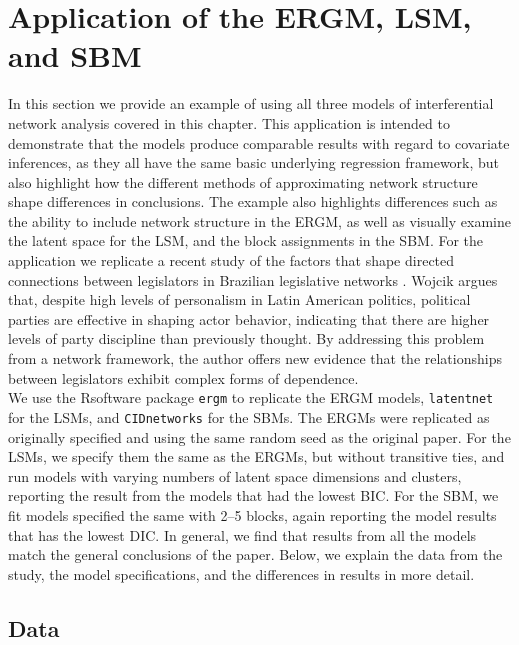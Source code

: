 \documentclass[fleqn,12pt]{wlscirep}
\newcommand{\R}{\textsf{R}\space} %
\begin{document}
\section{Application of the ERGM, LSM, and SBM}
In this section we provide an example of using all three models of interferential network analysis covered in this chapter. This application is intended to demonstrate that the models produce comparable results with regard to covariate inferences, as they all have the same basic underlying regression framework, but also highlight how the different methods of approximating network structure shape differences in conclusions. The example also highlights differences such as the ability to include network structure in the ERGM, as well as visually examine the latent space for the LSM, and the block assignments in the SBM. For the application we replicate a recent study of the factors that shape directed connections between legislators in Brazilian legislative networks \citep{wojcik2017legislative}. Wojcik argues that, despite high levels of personalism in Latin American politics, political parties are effective in shaping actor behavior, indicating that there are higher levels of party discipline than previously thought. By addressing this problem from a network framework, the author offers new evidence that the relationships between legislators exhibit complex forms of dependence.\\

We use the \R software package \texttt{ergm} \citep{ergm} to replicate the ERGM models, \texttt{latentnet} \citep{latentnet} for the LSMs, and \texttt{CIDnetworks} \citep{cidnetworks} for the SBMs. The ERGMs were replicated as originally specified and using the same random seed as the original paper. For the LSMs, we specify them the same as the ERGMs, but without transitive ties, and run models with varying numbers of latent space dimensions and clusters, reporting the result from the models that had the lowest BIC. For the SBM, we fit models specified the same with 2--5 blocks, again reporting the model results that has the lowest DIC. In general, we find that results from all the models match the general conclusions of the paper. Below, we explain the data from the study, the model specifications, and the differences in results in more detail. 


\subsection{Data}
\end{document}
